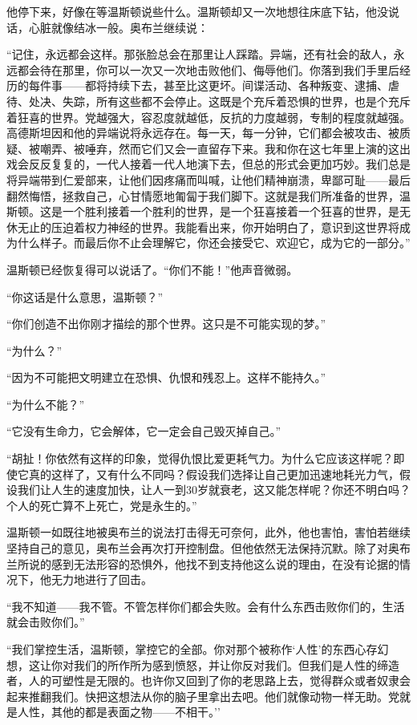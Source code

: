 他停下来，好像在等温斯顿说些什么。温斯顿却又一次地想往床底下钻，他没说话，心脏就像结冰一般。奥布兰继续说：

``记住，永远都会这样。那张脸总会在那里让人踩踏。异端，还有社会的敌人，永远都会待在那里，你可以一次又一次地击败他们、侮辱他们。你落到我们手里后经历的每件事——都将持续下去，甚至比这更坏。间谍活动、各种叛变、逮捕、虐待、处决、失踪，所有这些都不会停止。这既是个充斥着恐惧的世界，也是个充斥着狂喜的世界。党越强大，容忍度就越低，反抗的力度越弱，专制的程度就越强。高德斯坦因和他的异端说将永远存在。每一天，每一分钟，它们都会被攻击、被质疑、被嘲弄、被唾弃，然而它们又会一直留存下来。我和你在这七年里上演的这出戏会反反复复的，一代人接着一代人地演下去，但总的形式会更加巧妙。我们总是将异端带到仁爱部来，让他们因疼痛而叫喊，让他们精神崩溃，卑鄙可耻——最后翻然悔悟，拯救自己，心甘情愿地匍匐于我们脚下。这就是我们所准备的世界，温斯顿。这是一个胜利接着一个胜利的世界，是一个狂喜接着一个狂喜的世界，是无休无止的压迫着权力神经的世界。我能看出来，你开始明白了，意识到这世界将成为什么样子。而最后你不止会理解它，你还会接受它、欢迎它，成为它的一部分。''

温斯顿已经恢复得可以说话了。``你们不能！''他声音微弱。

``你这话是什么意思，温斯顿？''

``你们创造不出你刚才描绘的那个世界。这只是不可能实现的梦。''

``为什么？''

``因为不可能把文明建立在恐惧、仇恨和残忍上。这样不能持久。''

``为什么不能？''

``它没有生命力，它会解体，它一定会自己毁灭掉自己。''

``胡扯！你依然有这样的印象，觉得仇恨比爱更耗气力。为什么它应该这样呢？即使它真的这样了，又有什么不同吗？假设我们选择让自己更加迅速地耗光力气，假设我们让人生的速度加快，让人一到30岁就衰老，这又能怎样呢？你还不明白吗？个人的死亡算不上死亡，党是永生的。''

温斯顿一如既往地被奥布兰的说法打击得无可奈何，此外，他也害怕，害怕若继续坚持自己的意见，奥布兰会再次打开控制盘。但他依然无法保持沉默。除了对奥布兰所说的感到无法形容的恐惧外，他找不到支持他这么说的理由，在没有论据的情况下，他无力地进行了回击。

``我不知道——我不管。不管怎样你们都会失败。会有什么东西击败你们的，生活就会击败你们。''

``我们掌控生活，温斯顿，掌控它的全部。你对那个被称作`人性'的东西心存幻想，这让你对我们的所作所为感到愤怒，并让你反对我们。但我们是人性的缔造者，人的可塑性是无限的。也许你又回到了你的老思路上去，觉得群众或者奴隶会起来推翻我们。快把这想法从你的脑子里拿出去吧。他们就像动物一样无助。党就是人性，其他的都是表面之物——不相干。''

